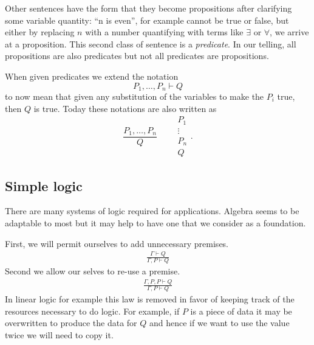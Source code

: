     




Other sentences have the form that they become propositions after clarifying
some variable quantity: ``n is even'', for example cannot be true or false, but
either by replacing $n$ with a number quantifying with terms like $\exists$ or 
$\forall$, we arrive at a proposition.  This second class of sentence is a
\emph{predicate}. In our telling, all propositions are also
predicates but not all predicates are propositions.

When given predicates we extend the notation 
\[
    P_1,\ldots,P_n \vdash Q 
\]
to now mean that given any substitution of the variables to make the $P_i$ true, 
then $Q$ is true.  Today these notations are also written as 
\[
    \frac{P_1,\ldots,P_n}{Q}\qquad \begin{array}{c} P_1\\ \vdots\\ P_n\\ \hline Q\end{array}.
\]

\subsection{Simple logic}
There are many systems of logic required for applications.  Algebra seems to be 
adaptable to most but it may help to have one that we consider as a foundation.

First, we will permit ourselves to add unnecessary premises.
\begin{gather}
    \tag{Weakening}
    \frac{
        \Gamma\vdash Q
    }{
        \Gamma, P \vdash Q 
    }
\end{gather}
Second we allow our selves to re-use a premise.
\begin{gather}
    \tag{Reuse}
    \frac{
        \Gamma, P,P\vdash Q
    }{
        \Gamma, P \vdash Q 
    }
\end{gather}
In linear logic for example this law is removed in favor of keeping 
track of the resources necessary to do logic.  For example, if $P$ 
is a piece of data it may be overwritten to produce the data for $Q$
and hence if we want to use the value twice we will need to copy it.

